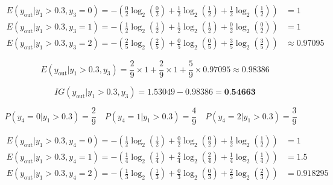 \documentclass[12pt]{article}
\begin{document}
\begin{enumerate}[leftmargin=\labelsep]
\begin{equation*}
    \begin{aligned}
        E(y_{\text{out}}|y_1 > 0.3, y_3 = 0) = - \left( \frac{0}{2} \log_2 \left( \frac{0}{2} \right) + \frac{1}{2} \log_2 \left( \frac{1}{2} \right) + \frac{1}{2} \log_2 \left( \frac{1}{2} \right) \right) &= 1 
        \\
        E(y_{\text{out}}|y_1 > 0.3, y_3 = 1) = - \left( \frac{1}{2} \log_2 \left( \frac{1}{2} \right) + \frac{1}{2} \log_2 \left( \frac{1}{2} \right) + \frac{0}{2} \log_2 \left( \frac{0}{2} \right) \right) &= 1
        \\
        E(y_{\text{out}}|y_1 > 0.3, y_3 = 2) = - \left( \frac{2}{5} \log_2 \left( \frac{2}{5} \right) + \frac{0}{5} \log_2 \left( \frac{0}{5} \right) + \frac{3}{5} \log_2 \left( \frac{3}{5} \right) \right) &\approx 0.97095
    \end{aligned}
\end{equation*}

\begin{equation*}
    E(y_{\text{out}}|y_1 > 0.3, y_3) = \frac{2}{9} \times  1 + \frac{2}{9} \times 1 + \frac{5}{9} \times 0.97095 \approx 0.98386
\end{equation*}

\begin{equation*}
    IG(y_{\text{out}} | y_1 > 0.3, y_3) = 1.53049 - 0.98386 = \textbf{0.54663}
\end{equation*}

\quad{}

\begin{equation*}
    P(y_4 = 0|y_1 > 0.3) = \frac{2}{9} \quad
    P(y_4 = 1|y_1 > 0.3) = \frac{4}{9} \quad
    P(y_4 = 2|y_1 > 0.3) = \frac{3}{9} \quad
\end{equation*}

\begin{equation*}
    \begin{aligned}
        E(y_{\text{out}}|y_1 > 0.3, y_4 = 0) = - \left( \frac{1}{2} \log_2 \left( \frac{1}{2} \right) + \frac{0}{2} \log_2 \left( \frac{0}{2} \right) + \frac{1}{2} \log_2 \left( \frac{1}{2} \right) \right) &= 1 
        \\
        E(y_{\text{out}}|y_1 > 0.3, y_4 = 1) = - \left( \frac{1}{4} \log_2 \left( \frac{1}{4} \right) + \frac{2}{4} \log_2 \left( \frac{2}{4} \right) + \frac{1}{4} \log_2 \left( \frac{1}{4} \right) \right) &= 1.5
        \\
        E(y_{\text{out}}|y_1 > 0.3, y_4 = 2) = - \left( \frac{1}{3} \log_2 \left( \frac{1}{3} \right) + \frac{0}{3} \log_2 \left( \frac{0}{3} \right) + \frac{2}{3} \log_2 \left( \frac{2}{3} \right) \right) &= 0.918295
    \end{aligned}
\end{equation*}


\end{enumerate}
\end{document}
